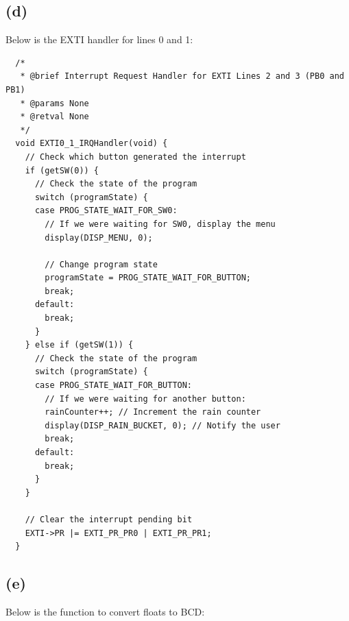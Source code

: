 \subsection*{(d)}
\label{sub:(d)}

Below is the EXTI handler for lines 0 and 1:\\

\begin{verbatim}
  /*
   * @brief Interrupt Request Handler for EXTI Lines 2 and 3 (PB0 and PB1)
   * @params None
   * @retval None
   */
  void EXTI0_1_IRQHandler(void) {
    // Check which button generated the interrupt
    if (getSW(0)) {
      // Check the state of the program
      switch (programState) {
      case PROG_STATE_WAIT_FOR_SW0:
        // If we were waiting for SW0, display the menu
        display(DISP_MENU, 0);

        // Change program state
        programState = PROG_STATE_WAIT_FOR_BUTTON;
        break;
      default:
        break;
      }
    } else if (getSW(1)) {
      // Check the state of the program
      switch (programState) {
      case PROG_STATE_WAIT_FOR_BUTTON:
        // If we were waiting for another button:
        rainCounter++; // Increment the rain counter
        display(DISP_RAIN_BUCKET, 0); // Notify the user
        break;
      default:
        break;
      }
    }

    // Clear the interrupt pending bit
    EXTI->PR |= EXTI_PR_PR0 | EXTI_PR_PR1;
  }
\end{verbatim}
\vspace{0.5cm}

\subsection*{(e)}
\label{sub:(e)}

Below is the function to convert floats to BCD:\\

